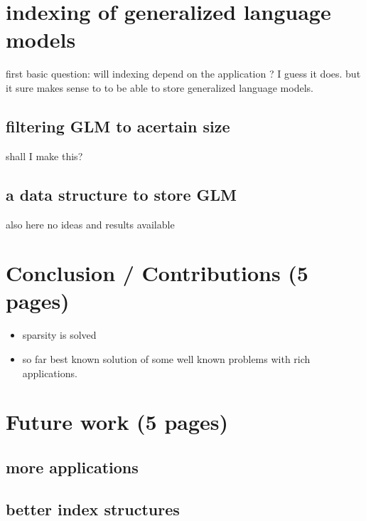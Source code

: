 \documentclass[•]{book}
\begin{document}
\chapter{indexing of generalized language models}
first basic question: will indexing depend on the application ? I guess it does. but it sure makes sense to to be able to store generalized language models.
\section{filtering GLM to acertain size}
shall I make this?
\section{a data structure to store GLM}
also here no ideas and results available

\chapter{Conclusion / Contributions (5 pages)}
\begin{itemize}
\item sparsity is solved
\item so far best known solution of some well known problems with rich applications. 
\end{itemize}
\chapter{Future work (5 pages)}
\section{more applications}

\section{better index structures}



\end{document}
